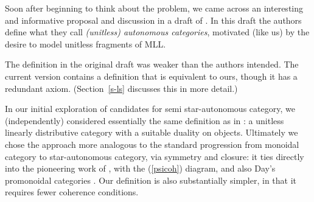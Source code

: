 \documentclass{robincs}
\newcommand\pref[1]{\textup(\ref{#1}\textup)}
\newcommand\staraut{star-aut\-on\-om\-ous\xspace}
\renewcommand\perp{^\bot}
\newcommand\dual[1]{#1\perp}
\newlength{\tw}\setlength{\tw}{\textwidth}\addtolength{\tw}{-\arrayrulewidth}
\begin{document}
Soon after beginning to think about the problem, we came across an
interesting and informative proposal and discussion in a draft of
\citet{LSFreeBool}.
%
In this draft the authors define what they call \emph{(unitless)
autonomous categories}, motivated (like us) by the desire to model
unitless fragments of MLL.

The definition in the original draft was weaker than the authors
intended. The current version contains a definition that is
equivalent to ours, though it has a redundant axiom.
%
(Section~\ref{s-ls} discusses this in more detail.)
%

In our initial exploration of candidates for semi \staraut
category, we (independently) considered essentially the same
definition as in \cite{ProofNetCats}: a unitless linearly
distributive category with a suitable duality on objects.  Ultimately
we chose the approach more analogous to the standard progression from
monoidal category to \staraut category, via symmetry and
closure: it ties directly into the pioneering work of \citet{EKClosed},
with the \pref{psicoh} diagram, and also Day's promonoidal categories
\citep{DayPro}. Our definition is also substantially simpler, in
that it requires fewer coherence conditions.

\end{document}

